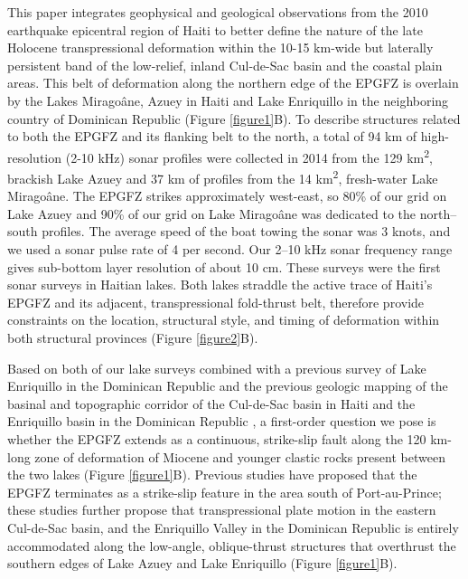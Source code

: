 \documentclass{nature}
\begin{document}
This paper integrates geophysical and geological observations from the 2010 earthquake epicentral region of Haiti to better define the nature of the late Holocene transpressional deformation within the 10-15 km-wide but laterally persistent band of the low-relief, inland Cul-de-Sac basin and the coastal plain areas. This belt of deformation along the northern edge of the EPGFZ is overlain by the Lakes Mirago\^ane, Azuey in Haiti and Lake Enriquillo in the neighboring country of Dominican Republic (Figure \ref{figure1}B). To describe structures related to both the EPGFZ and its flanking belt to the north, a total of 94 km of high-resolution (2-10 kHz) sonar profiles were collected in 2014 from the 129 km\textsuperscript{2}, brackish Lake Azuey and 37 km of profiles from the 14 km\textsuperscript{2}, fresh-water Lake Mirago\^ane. The EPGFZ strikes approximately west-east, so 80\% of our grid on Lake Azuey and 90\% of our grid on Lake Mirago\^ane was dedicated to the north--south profiles. The average speed of the boat towing the sonar was 3 knots, and we used a sonar pulse rate of 4 per second. Our 2--10 kHz sonar frequency range gives sub-bottom layer resolution of about 10 cm. These surveys were the first sonar surveys in Haitian lakes. Both lakes straddle the active trace of Haiti's EPGFZ and its adjacent, transpressional fold-thrust belt, therefore provide constraints on the location, structural style, and timing of deformation within both structural provinces (Figure \ref{figure2}B).

Based on both of our lake surveys combined with a previous survey of Lake Enriquillo in the Dominican Republic \citep{rios2013holocene} and the previous geologic mapping of the basinal and topographic corridor of the Cul-de-Sac basin in Haiti and the Enriquillo basin in the Dominican Republic \citep{mann1995actively,mann1999caribbean}, a first-order question we pose is whether the EPGFZ extends as a continuous, strike-slip fault along the 120 km-long zone of deformation of Miocene and younger clastic rocks present between the two lakes (Figure \ref{figure1}B). Previous studies  \citep{saint2015seismotectonics,symithe2016present} have proposed that the EPGFZ terminates as a strike-slip feature in the area south of Port-au-Prince; these studies further propose that transpressional plate motion in the eastern Cul-de-Sac basin, and the Enriquillo Valley in the Dominican Republic is entirely accommodated along the low-angle, oblique-thrust structures that overthrust the southern edges of Lake Azuey and Lake Enriquillo (Figure \ref{figure1}B).   
\end{document}
